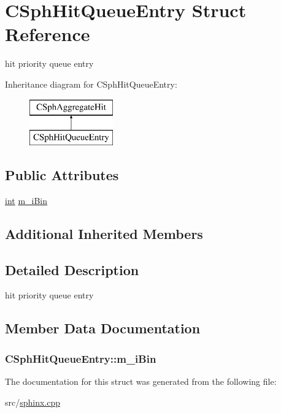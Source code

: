 \hypertarget{structCSphHitQueueEntry}{\section{C\-Sph\-Hit\-Queue\-Entry Struct Reference}
\label{structCSphHitQueueEntry}
}


hit priority queue entry  


Inheritance diagram for C\-Sph\-Hit\-Queue\-Entry\-:\begin{figure}[H]
\begin{center}
\leavevmode
\includegraphics[height=2.000000cm]{structCSphHitQueueEntry}
\end{center}
\end{figure}
\subsection*{Public Attributes}
\begin{DoxyCompactItemize}
\item 
\hyperlink{sphinxexpr_8cpp_a4a26e8f9cb8b736e0c4cbf4d16de985e}{int} \hyperlink{structCSphHitQueueEntry_a26d140a2f74b3d63284f3044c71f392d}{m\-\_\-i\-Bin}
\end{DoxyCompactItemize}
\subsection*{Additional Inherited Members}


\subsection{Detailed Description}
hit priority queue entry 

\subsection{Member Data Documentation}
\hypertarget{structCSphHitQueueEntry_a26d140a2f74b3d63284f3044c71f392d}{
\subsubsection[{m\-\_\-i\-Bin}]{ C\-Sph\-Hit\-Queue\-Entry\-::m\-\_\-i\-Bin}}\label{structCSphHitQueueEntry_a26d140a2f74b3d63284f3044c71f392d}


The documentation for this struct was generated from the following file\-:\begin{DoxyCompactItemize}
\item 
src/\hyperlink{sphinx_8cpp}{sphinx.\-cpp}\end{DoxyCompactItemize}
